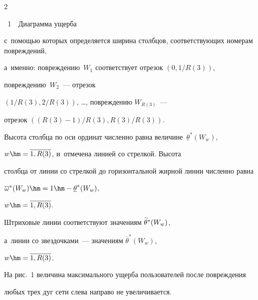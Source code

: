 \begin{multicols}{2}
{\begin{center}
\noindent


{{\figurename~1}\ \ \small{Диаграмма ущерба}}


\end{center}


}











\vspace*{9pt}





\addtocounter{figure}{1}





 








\noindent


с~помощью которых определяется ширина столбцов, соответствующих номерам повреждений, 


а~именно:  повреждению~$W_1$ соответствует отрезок $(0, {1}/{R(3)})$, 


повреждению~$W_2$~--- отрезок 


$({1}/{R(3)}, {2}/{R(3)})$, \ldots, повреждению $W_{R(3)}$~--- 


отрезок  $({(R(3) - 1)}/{R(3)}, {R(3)}/R(3))$. 


Высота столбца по оси ординат численно равна величине~$\underline {\theta}^*(W_w)$, 


$w\hm = \overline{1, R(3)}$, и~отмечена линией со стрелкой.  Высота %


столбца от линии со стрелкой до горизонтальной жирной линии численно равна 


$\overline {\omega}^*(W_w) \hm= 1 \hm-   \underline {\theta}^*(W_w)$, 


$w \hm= \overline{1, R(3)}. $


Штриховые линии соответствуют значениям $\widetilde {\theta}^*(W_w)$,\linebreak 


а~линии со звездочками~--- значениям $\overline {\theta}^*(W_w)$, 


$w \hm= \overline{1, R(3)}$.


На  рис.~1 величина максимального ущерба пользователей после повреждения 


любых трех дуг сети слева направо не увеличивается. 



\end{multicols}

